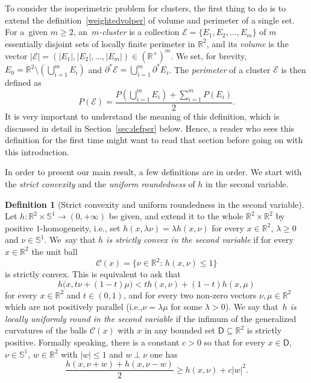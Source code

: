\documentclass[11pt]{article}
\newcommand{\ie}{i.e.,\xspace}
\numberwithin{equation}{section}
\newcommand\R{\mathbb{R}}
\renewcommand\S{\mathbb{S}}
\newcommand\C{\mathcal{C}}
\newcommand\E{\mathcal{E}}
\theoremstyle{plain}
\theoremstyle{definition}
\newtheorem{defn}[thm]{Definition}
\begin{document}
To consider the isoperimetric problem for clusters, the first thing to do is to extend the definition~\eqref{weightedvolper} of volume and perimeter of a single set. For a~given $m\geq 2$, an~\emph{$m$\nobreakdash-cluster} is a collection $\E=\{E_1,E_2,\dots, E_m\}$ of $m$ essentially disjoint sets of local\-ly finite perimeter in $\R^2$, and its \emph{volume} is the vector $|\E|=(|E_1|, |E_2|,\dots, |E_m|)\in (\R^+)^m$. We set, for brevity, $E_0=\R^2\setminus (\bigcup_{i=1}^m E_i)$ and $\partial^* \E=\bigcup_{i=1}^m \partial^* E_i$. The \emph{perimeter} of a cluster $\E$ is then defined as
\begin{equation}\label{PbE}
P(\E) = \frac{P(\bigcup_{i=1}^m E_i) + \sum_{i=1}^m P(E_i) }2 .
\end{equation}
It is very important to understand the meaning of this definition, which is discussed in detail in Section~\ref{sec:defper} below. Hence, a reader who sees this definition for the first time might want to read that section before going on with this introduction.

In order to present our main result, a few definitions are in order. We start with the \emph{strict convexity} and the \emph{uniform roundedness} of $h$ in the second variable.
\begin{defn}[Strict convexity and uniform roundedness in the second variable]\label{strictconv}
Let $h:\R^2\times\S^1\to (0,+\infty)$ be given, and extend it to the whole $\R^2\times\R^2$ by positive $1$-homogeneity, \ie set $h(x,\lambda\nu)=\lambda h(x,\nu)$ for every $x\in\R^2$, $\lambda\geq 0$ and $\nu\in\S^1$. We~say that \emph{$h$ is strictly convex in the second variable} if for every $x\in\R^2$ the unit ball
\begin{equation}\label{unitball}
\C(x) = \big\{ \nu\in\R^2:\, h(x,\nu)\leq 1\big\}
\end{equation}
is strictly convex. This is equivalent to ask that
\[
h\big(x,t\nu+(1-t)\mu\big) < th(x,\nu) + (1-t) h(x,\mu)
\]
for every $x\in\R^2$ and $t\in(0,1)$, and for every two non-zero vectors $\nu,\mu\in\R^2$ which are not positively parallel (\ie $\nu=\lambda\mu$ for some $\lambda>0$). We say that~\emph{$h$ is locally uniformly round in the second variable} if the infimum of the generalized curvatures of the balls $\C(x)$ with $x$ in any bounded set $\mathsf{D}\subseteq\R^2$ is strictly positive. Formally speaking, there is a constant $c>0$ so that for every $x\in \mathsf{D}$, $\nu\in \S^1$, $w\in\R^2$ with $|w|\leq 1$ and $w\perp \nu$ one has\vspace*{-3pt}\enlargethispage{.5\baselineskip}%
\begin{equation}\label{numero}
\frac{h(x,\nu+w) + h(x,\nu-w)}2 \geq h(x,\nu) + c |w|^2.
\end{equation}
\end{defn}
\end{document}
